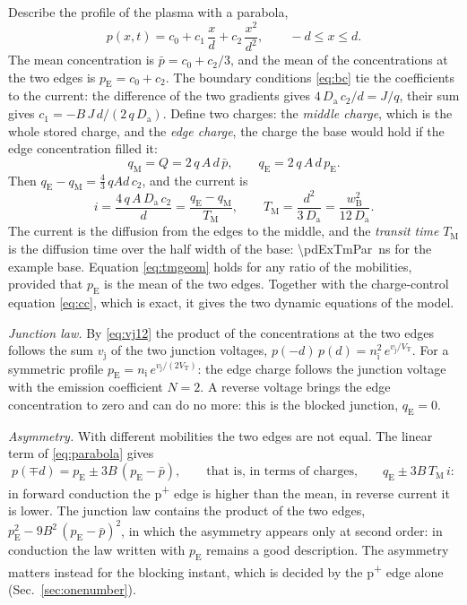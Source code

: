 \documentclass[10pt,a4paper]{scrartcl}
\newcommand{\TM}{T_\mathrm{M}}
\newcommand{\qE}{q_\mathrm{E}}
\newcommand{\qM}{q_\mathrm{M}}
\newcommand{\vj}{v_\mathrm{j}}
\newcommand{\VT}{V_\mathrm{T}}
\newcommand{\Nem}{N}                          %
\newcommand{\nint}{n_\mathrm{i}}
\newcommand{\wB}{w_\mathrm{B}}
\newcommand{\Da}{D_\mathrm{a}}
\newcommand{\Pp}{p\textsuperscript{+}}
\begin{document}
Describe the profile of the plasma with a parabola,
\begin{equation}
p(x,t) = c_0 + c_1\,\frac{x}{d} + c_2\,\frac{x^2}{d^2} , \qquad -d \leq x \leq d .
\label{eq:parabola}
\end{equation}
The mean concentration is $\bar p = c_0 + c_2/3$, and the mean of the concentrations at the two edges is $p_\mathrm{E} = c_0 + c_2$. The boundary conditions \eqref{eq:bc} tie the coefficients to the current: the difference of the two gradients gives $4\,\Da\,c_2/d = J/q$, their sum gives $c_1 = -B\,J\,d/(2\,q\,\Da)$. Define two charges: the \emph{middle charge}, which is the whole stored charge, and the \emph{edge charge}, the charge the base would hold if the edge concentration filled it:
\begin{equation}
\qM = Q = 2\,q\,A\,d\,\bar p , \qquad \qE = 2\,q\,A\,d\,p_\mathrm{E} .
\label{eq:lumpeddef}
\end{equation}
Then $\qE - \qM = \tfrac43\,qAd\,c_2$, and the current is
\begin{equation}
i = \frac{4\,q\,A\,\Da\,c_2}{d} = \frac{\qE - \qM}{\TM} , \qquad \TM = \frac{d^2}{3\,\Da} = \frac{\wB^2}{12\,\Da} .
\label{eq:tmgeom}
\end{equation}
The current is the diffusion from the edges to the middle, and the \emph{transit time} $\TM$ is the diffusion time over the half width of the base: \SI{\pdExTmPar}{\nano\second} for the example base. Equation \eqref{eq:tmgeom} holds for any ratio of the mobilities, provided that $p_\mathrm{E}$ is the mean of the two edges. Together with the charge-control equation \eqref{eq:cc}, which is exact, it gives the two dynamic equations of the model.

\emph{Junction law.} By \eqref{eq:vj12} the product of the concentrations at the two edges follows the sum $\vj$ of the two junction voltages, $p(-d)\,p(d) = \nint^2\,e^{\vj/\VT}$. For a symmetric profile $p_\mathrm{E} = \nint\,e^{\vj/(2\VT)}$: the edge charge follows the junction voltage with the emission coefficient $\Nem = 2$. A reverse voltage brings the edge concentration to zero and can do no more: this is the blocked junction, $\qE = 0$.

\emph{Asymmetry.} With different mobilities the two edges are not equal. The linear term of \eqref{eq:parabola} gives
\begin{equation}
p(\mp d) = p_\mathrm{E} \pm 3B\,(p_\mathrm{E} - \bar p) , \qquad \text{that is, in terms of charges,} \qquad \qE \pm 3B\,\TM\,i :
\label{eq:edgesasym}
\end{equation}
in forward conduction the \Pp{} edge is higher than the mean, in reverse current it is lower. The junction law contains the product of the two edges, $p_\mathrm{E}^2 - 9B^2\,(p_\mathrm{E}-\bar p)^2$, in which the asymmetry appears only at second order: in conduction the law written with $p_\mathrm{E}$ remains a good description. The asymmetry matters instead for the blocking instant, which is decided by the \Pp{} edge alone (Sec.~\ref{sec:onenumber}).
\end{document}
